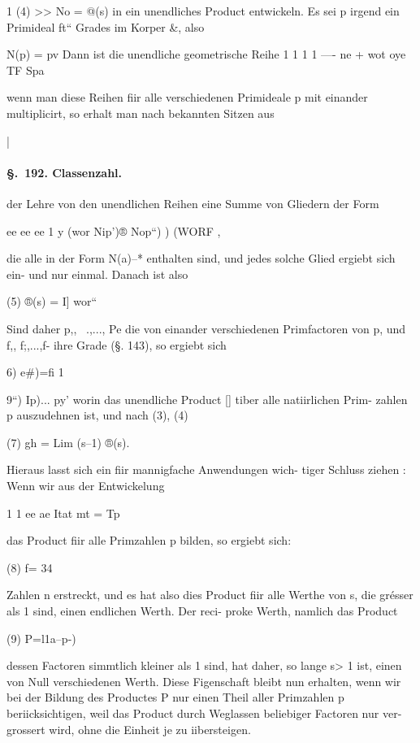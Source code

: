 \documentclass[12pt,a4paper]{article}
\theoremstyle{plain}
\theoremstyle{definition}
\begin{document}
1 (4) >> No = @(s) in ein unendliches Product entwickeln. Es sei p irgend ein Primideal ft`` Grades im Korper \&, also

N(p) = pv Dann ist die unendliche geometrische Reihe 1 1 1 1 ---- ne + wot oye TF Spa

wenn man diese Reihen fiir alle verschiedenen Primideale p mit einander multiplicirt, so erhalt man nach bekannten Sitzen aus

|

\paragraph{\S.~192. Classenzahl.}


der Lehre von den unendlichen Reihen eine Summe von Gliedern der Form

ee ee ee 1 y (wor Nip')® Nop``) ) (WORF ,

die alle in der Form N(a)--* enthalten sind, und jedes solche Glied ergiebt sich ein- und nur einmal. Danach ist also

(5) ®(s) = I] wor``

Sind daher p,, ~.,..., Pe die von einander verschiedenen Primfactoren von p, und f,, f;,...,f- ihre Grade (§. 143), so ergiebt sich

6) e\#)=fi 1

9``) Ip)... py' worin das unendliche Product [] tiber alle natiirlichen Prim- zahlen p auszudehnen ist, und nach (3), (4)

(7) gh = Lim (s--1) ®(s).

Hieraus lasst sich ein fiir mannigfache Anwendungen wich- tiger Schluss ziehen : Wenn wir aus der Entwickelung

1 1 ee ae Itat mt = Tp

das Product fiir alle Primzahlen p bilden, so ergiebt sich:

(8) f= 34

Zahlen n erstreckt, und es hat also dies Product fiir alle Werthe von s, die grésser als 1 sind, einen endlichen Werth. Der reci- proke Werth, namlich das Product

(9) P=l1a--p-)

dessen Factoren simmtlich kleiner als 1 sind, hat daher, so lange s> 1 ist, einen von Null verschiedenen Werth. Diese Figenschaft bleibt nun erhalten, wenn wir bei der Bildung des Productes P nur einen Theil aller Primzahlen p beriicksichtigen, weil das Product durch Weglassen beliebiger Factoren nur ver- grossert wird, ohne die Einheit je zu iibersteigen.
\end{document}

